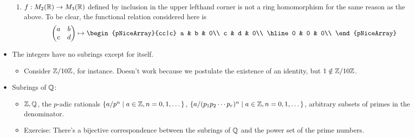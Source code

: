 \documentclass[../notes.tex]{subfiles}
\begin{document}
\begin{itemize}
\begin{enumerate}
        \item $f:M_2(\mathbb{R})\to M_3(\mathbb{R})$ defined by inclusion in the upper lefthand corner is not a ring homomorphism for the same reason as the above. To be clear, the functional relation considered here is
        \begin{equation*}
            \begin{pmatrix}
                a & b\\
                c & d\\
            \end{pmatrix}
            \mapsto
            \begin{pNiceArray}{cc|c}
                a & b & 0\\
                c & d & 0\\ \hline
                0 & 0 & 0\\
            \end{pNiceArray}
        \end{equation*}
    \end{enumerate}
    \item The integers have no subrings except for itself.
    \begin{itemize}
        \item Consider $\mathbb{Z}/10\mathbb{Z}$, for instance. Doesn't work because we postulate the existence of an identity, but $1\notin\mathbb{Z}/10\mathbb{Z}$.
    \end{itemize}
    \item Subrings of $\mathbb{Q}$:
    \begin{itemize}
        \item $\mathbb{Z},\mathbb{Q}$, the $p$-adic rationals $\{a/p^n\mid a\in\mathbb{Z},n=0,1,\dots\}$, $\{a/(p_1p_2\cdots p_r)^n\mid a\in\mathbb{Z},n=0,1,\dots\}$, arbitrary subsets of primes in the denominator.
        \item Exercise: There's a bijective correspondence between the subrings of $\mathbb{Q}$ and the power set of the prime numbers.
    \end{itemize}
\end{itemize}
\end{document}
